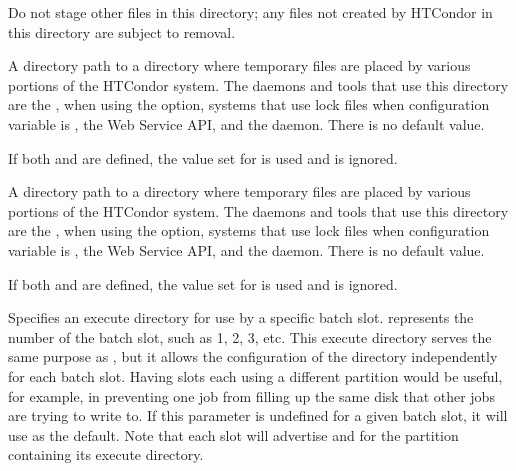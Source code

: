 \begin{description}
  Do not stage other files in this directory;
  any files not created by HTCondor in this directory are subject to removal.


\label{param:TmpDir}
\item[\Macro{TMP\_DIR}]
  A directory path to a directory where temporary files are placed by
  various portions of the HTCondor system.
  The daemons and tools that use this directory are
  the , 
   when using the  option,
  systems that use lock files when configuration variable
   is ,
  the Web Service API,
  and the  daemon.
  There is no default value.

  If both  and  are defined, 
  the value set for  is used and  
  is ignored.

\label{param:TempDir}
\item[\Macro{TEMP\_DIR}]
  A directory path to a directory where temporary files are placed by
  various portions of the HTCondor system.
  The daemons and tools that use this directory are
  the , 
   when using the  option,
  systems that use lock files when configuration variable
   is ,
  the Web Service API,
  and the  daemon.
  There is no default value.

  If both  and  are defined, 
  the value set for  is used and  
  is ignored.

\label{param:SlotNExecute}
\item[\Macro{SLOT<N>\_EXECUTE}]
  Specifies an
  execute directory for use by a specific batch slot.
   represents the number of the batch slot, such as 1, 2, 3, etc.
  This execute directory serves the same purpose as , but it
  allows the configuration of the directory independently for each batch
  slot.  Having slots each using a different partition would be
  useful, for example, in preventing one job from filling up the same
  disk that other jobs are trying to write to.  If this parameter is
  undefined for a given batch slot, it will use  as
  the default.  Note that each slot will advertise 
  and  for the partition containing its execute
  directory.


\end{description}
